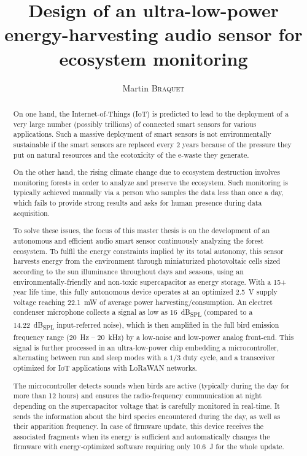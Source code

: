 \documentclass{EPL-master-thesis-covers-EN}
\title{Design of an ultra-low-power energy-harvesting audio sensor for ecosystem monitoring}
\author{Martin \textsc{Braquet}\!\nnfootnote{\url{martin.braquet@hotmail.com}}}
\begin{document}
\hypersetup{pageanchor=false}

\maketitle

\begin{abstract}

On one hand, the Internet-of-Things (IoT) is predicted to lead to the deployment of a very large number (possibly trillions) of connected smart sensors for various applications. Such a massive deployment of smart sensors is not environmentally sustainable if the smart sensors are replaced every 2 years because of the pressure they put on natural resources and the ecotoxicity of the e-waste they generate.

On the other hand, the rising climate change due to ecosystem destruction involves monitoring forests in order to analyze and preserve the ecosystem. Such monitoring is typically achieved manually via a person who samples the data less than once a day, which fails to provide strong results and asks for human presence during data acquisition.

To solve these issues, the focus of this master thesis is on the development of an autonomous and efficient audio smart sensor continuously analyzing the forest ecosystem. To fulfil the energy constraints implied by its total autonomy, this sensor harvests energy from the environment through miniaturized photovoltaic cells sized according to the sun illuminance throughout days and seasons, using an environmentally-friendly and non-toxic supercapacitor as energy storage.
With a 15+ year life time, this fully autonomous device operates at an optimized \SI{2.5}{V} supply voltage reaching \SI{22.1}{mW} of average power harvesting/consumption. An electret condenser microphone collects a signal as low as \SI{16}{dB_{SPL}} (compared to a \SI{14.22}{dB_{SPL}} input-referred noise), which is then amplified in the full bird emission frequency range (\SI{20}{Hz} -- \SI{20}{kHz}) by a low-noise and low-power analog front-end. This signal is further processed in an ultra-low-power chip embedding a microcontroller, alternating between run and sleep modes with a $1/3$ duty cycle, and a transceiver optimized for IoT applications with LoRaWAN networks. 

The microcontroller detects sounds when birds are active (typically during the day for more than 12 hours) and ensures the radio-frequency communication at night depending on the supercapacitor voltage that is carefully monitored in real-time. It sends the information about the bird species encountered during the day, as well as their apparition frequency. In case of firmware update, this device receives the associated fragments when its energy is sufficient and automatically changes the firmware with energy-optimized software requiring only \SI{10.6}{J} for the whole update.


\end{abstract}
\end{document}
